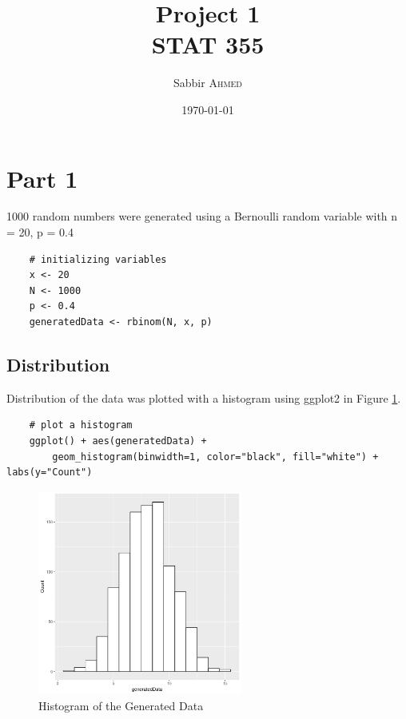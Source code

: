 \documentclass{article}
\title{Project 1 \\ STAT 355} %
\author{Sabbir \textsc{Ahmed}} %
\date{\today} %
\begin{document}
    \maketitle %

    \section{Part 1}
        1000 random numbers were generated using a Bernoulli random variable with n = 20, p = 0.4
\begin{lstlisting}
    # initializing variables
    x <- 20
    N <- 1000
    p <- 0.4
    generatedData <- rbinom(N, x, p)
\end{lstlisting}

        \subsection{Distribution}
            Distribution of the data was plotted with a histogram using ggplot2 in Figure \ref{fig:hist}.
\begin{lstlisting}
    # plot a histogram
    ggplot() + aes(generatedData) + 
        geom_histogram(binwidth=1, color="black", fill="white") + labs(y="Count")
\end{lstlisting}

            \begin{figure}[h]
                \begin{center}
                    \includegraphics[width=0.6\textwidth]{figures/hist.png}
                    \caption{Histogram of the Generated Data} \label{fig:hist}
                \end{center}
            \end{figure}
\end{document}
